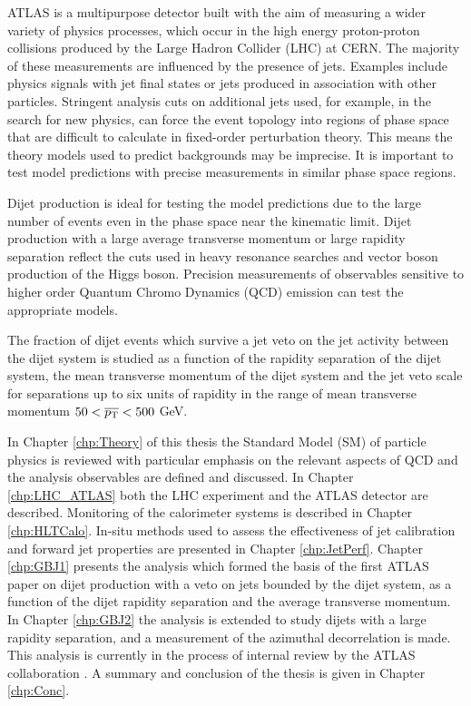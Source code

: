 ATLAS is a multipurpose detector built with the aim of measuring a wider variety of physics processes, which occur in the high energy proton-proton collisions produced by the Large Hadron Collider (LHC) at CERN.
The majority of these measurements are influenced by the presence of jets.
Examples include physics signals with jet final states or jets produced in association with other particles.
Stringent analysis cuts on additional jets used, for example, in the search for new physics, can force the event topology into regions of phase space that are difficult to calculate in fixed-order perturbation theory.
This means the theory models used to predict backgrounds may be imprecise.
It is important to test model predictions with precise measurements in similar phase space regions.

Dijet production is ideal for testing the model predictions due to the large number of events even in the phase space near the kinematic limit. 
Dijet production with a large average transverse momentum or large rapidity separation reflect the cuts used in heavy resonance searches and vector boson production of the Higgs boson. 
Precision measurements of observables sensitive to higher order Quantum Chromo Dynamics (QCD) emission can test the appropriate models.

The fraction of dijet events which survive a jet veto on the jet activity between the dijet system is studied as a function of the rapidity separation of the dijet system, the mean transverse momentum of the dijet system and the jet veto scale for separations up to six units of rapidity in the range of mean transverse momentum $50<\mbox{$\overline{p_{\rm T}}$}{}<500$ GeV.

In Chapter \ref{chp:Theory} of this thesis the Standard Model (SM) of particle physics is reviewed with particular emphasis on the relevant aspects of QCD and the analysis observables are defined and discussed. 
In Chapter \ref{chp:LHC_ATLAS} both the LHC experiment and the ATLAS detector are described. 
Monitoring of the calorimeter systems is described in Chapter \ref{chp:HLTCalo}.
In-situ methods used to assess the effectiveness of jet calibration and forward jet properties are presented in Chapter \ref{chp:JetPerf}.
Chapter \ref{chp:GBJ1} presents the analysis which formed the basis of the first ATLAS paper \cite{ref:ATLASGap} on dijet production with a veto on jets bounded by the dijet system, as a function of the dijet rapidity separation and the average transverse momentum. 
In Chapter \ref{chp:GBJ2} the analysis is extended to study dijets with a large rapidity separation, and a measurement of the azimuthal decorrelation is made.
This analysis is currently in the process of internal review by the ATLAS collaboration \cite{ref:GBJInternal}.
A summary and conclusion of the thesis is given in Chapter \ref{chp:Conc}.


